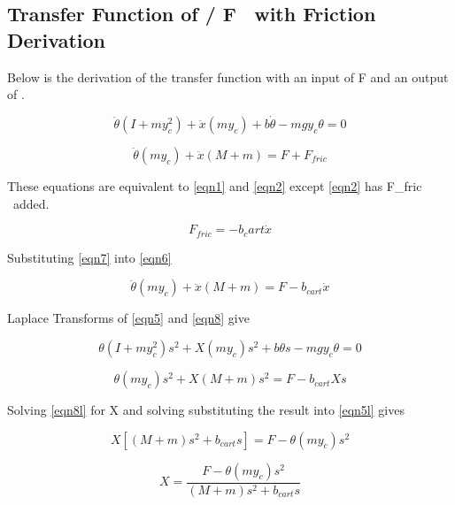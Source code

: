 \documentclass{article}
\begin{document}
\subsection{Transfer Function of \theta / F \ \textrm{with Friction Derivation}}

Below is the derivation of the transfer function with an input of F and an output of \theta.

\begin{equation} 
\label{eqn5}
\ddot \theta (I+m y_c^2)+\ddot x (m y_c)+b \dot \theta - m g y_c \theta = 0 
\end{equation}

\begin{equation} 
\label{eqn6}
\ddot \theta(m y_c) + \ddot x(M+m) = F+ F_{fric}
\end{equation}

These equations are equivalent to \ref{eqn1} and \ref{eqn2} except \ref{eqn2} has F_{fric} \ \textrm{added}.

\begin{equation}
\label{eqn7}
F_{fric} = - b_cart \dot x
\end{equation}

Substituting \ref{eqn7} into \ref{eqn6}

\begin{equation} 
\label{eqn8}
\ddot \theta(m y_c) + \ddot x(M+m) = F - b_{cart} \dot x
\end{equation}

Laplace Transforms of \ref{eqn5} and \ref{eqn8} give

\begin{equation} 
\label{eqn5l}
\theta (I+m y_c^2) s^2+ X (m y_c) s^2+b \theta s - m g y_c \theta = 0 
\end{equation}

\begin{equation} 
\label{eqn8l}
\theta (m y_c) s^2+ X (M+m) s^2= F - b_{cart} X s
\end{equation}

Solving \ref{eqn8l} for X and solving substituting the result into \ref{eqn5l} gives

\begin{equation} 
\label{eqn8lb}
X [(M+m) s^2 + b_{cart} s]= F - \theta(m y_c) s^2
\end{equation}

\begin{equation} 
\label{eqn8lc}
X = \frac{F - \theta(m y_c) s^2}{(M+m) s^2 + b_{cart} s}
\end{equation}
\end{document}
